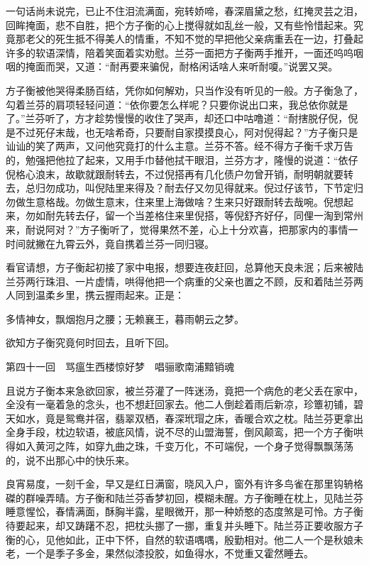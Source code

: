\documentclass[12pt,UTF8]{ctexbook}
\begin{document}
{{{一句话尚未说完，已止不住泪流满面，宛转娇啼，春深眉黛之愁，红掩灵芸之泪，回眸掩面，悲不自胜，把个方子衡的心上搅得就如乱丝一般，又有些怜惜起来。究竟那老父的死生抵不得美人的情重，不知不觉的早把他父亲病重丢在一边，打叠起许多的软语深情，陪着笑面着实劝慰。兰芬一面把方子衡两手推开，一面还呜呜咽咽的掩面而哭，又道：“耐再要来骗倪，耐格闲话啥人来听耐嗄。”说罢又哭。

方子衡被他哭得柔肠百结，凭你如何解劝，只当作没有听见的一般。方子衡急了，勾着兰芬的肩项轻轻问道：“依你要怎么样呢？只要你说出口来，我总依你就是了。”兰芬听了，方才趁势慢慢的收住了哭声，却还口中咕噜道：“耐搳脱仔倪，倪是不过死仔末哉，也无啥希奇，只要耐自家摸摸良心，阿对倪得起？”方子衡只是讪讪的笑了两声，又问他究竟打的什么主意。兰芬不答。经不得方子衡千求万告的，勉强把他拉了起来，又用手巾替他拭干眼泪，兰芬方才，隆慢的说道：“依仔倪格心浪末，故歇就跟耐转去，不过倪搭再有几化债户勿曾开销，耐明朝就要转去，总归勿成功，叫倪陆里来得及？耐去仔又勿见得就来。倪过仔该节，下节定归勿做生意格哉。勿做生意末，住来里上海做啥？生来只好跟耐转去哉啘。倪想起来，勿如耐先转去仔，留一个当差格住来里倪搭，等倪舒齐好仔，同俚一淘到常州来，耐说阿对？”方子衡听了，觉得果然不差，心上十分欢喜，把那家内的事情一时间就撇在九霄云外，竟自携着兰芬一同归寝。

看官请想，方子衡起初接了家中电报，想要连夜赶回，总算他天良未泯；后来被陆兰芬两行珠泪、一片虚情，哄得他把一个病重的父亲也置之不顾，反和着陆兰芬两人同到温柔乡里，携云握雨起来。正是：

多情神女，飘烟抱月之腰；无赖襄王，暮雨朝云之梦。

欲知方子衡究竟何时回去，且听下回。





第四十一回　骂瘟生西楼惊好梦　唱骊歌南浦黯销魂





且说方子衡本来急欲回家，被兰芬灌了一阵迷汤，竟把一个病危的老父丢在家中，全没有一毫着急的念头，也不想赶回家去。他二人倒趁着雨后新凉，珍簟初铺，碧天如水，竟是鸳鸯并宿，翡翠双栖，春深玳瑁之床，香暖合欢之枕。陆兰芬更拿出全身手段，枕边软语，被底风情，说不尽的山盟海誓，倒风颠鸾，把一个方子衡哄得如入黄河之阵，如穿九曲之珠，千变万化，不可端倪，一个身子觉得飘飘荡荡的，说不出那心中的快乐来。

良宵易度，一刻千金，早又是红日满窗，晓风入户，窗外有许多鸟雀在那里钩辀格磔的群噪弄晴。方子衡和陆兰芬香梦初回，模糊未醒。方子衡睡在枕上，见陆兰芬睡意惺忪，春情满面，酥胸半露，星眼微开，那一种娇憨的态度煞是可怜。方子衡待要起来，却又踌躇不忍，把枕头挪了一挪，重复并头睡下。陆兰芬正要收服方子衡的心，见他如此，正中下怀，自然的软语喁喁，殷勤相对。他二人一个是秋娘未老，一个是季子多金，果然似漆投胶，如鱼得水，不觉重又霍然睡去。

}}}
\end{document}
